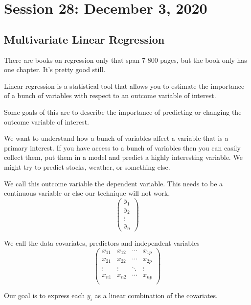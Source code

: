 \chapter{Session 28: December 3, 2020}

\section{Multivariate Linear Regression}
There are books on regression only that span 7-800 pages, but the book only has one chapter. It's pretty good still.

Linear regression is a statistical tool that allows you to estimate the importance of a bunch of variables with respect to an outcome variable of interest. 

Some goals of this are to describe the importance of predicting or changing the outcome variable of interest. 

We want to understand how a bunch of variables affect a variable that is a primary interest. If you have access to a bunch of variables then you can easily collect them, put them in a model and predict a highly interesting variable. We might try to predict stocks, weather, or something else.

We call this outcome variable the dependent variable. This needs to be a continuous variable or else our technique will not work.
\begin{equation*}
    \begin{pmatrix}
    y_1 \\ y_2 \\ \vdots \\ y_n
    \end{pmatrix}
\end{equation*}

We call the data covariates, predictors and independent variables
\begin{equation*}
\begin{pmatrix}
    x_{11} & x_{12} & \cdots & x_{1p} \\
    x_{21} & x_{22} & \cdots & x_{2p} \\
    \vdots & \vdots & \ddots & \vdots \\
    x_{n1} & x_{n2} & \cdots & x_{np} \\
\end{pmatrix}
\end{equation*}

Our goal is to express each $y_i$ as a linear combination of the covariates.


